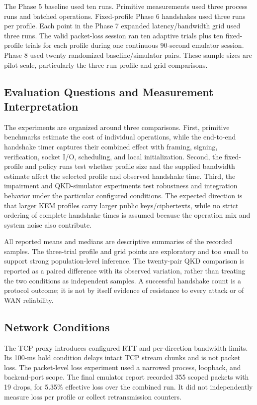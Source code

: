 \documentclass[journal]{IEEEtran}
\begin{document}
The Phase 5 baseline used ten runs. Primitive measurements used three process runs and batched operations. Fixed-profile Phase 6 handshakes used three runs per profile. Each point in the Phase 7 expanded latency/bandwidth grid used three runs. The valid packet-loss session ran ten adaptive trials plus ten fixed-profile trials for each profile during one continuous 90-second emulator session. Phase 8 used twenty randomized baseline/simulator pairs. These sample sizes are pilot-scale, particularly the three-run profile and grid comparisons.

\subsection{Evaluation Questions and Measurement Interpretation}
The experiments are organized around three comparisons. First, primitive benchmarks estimate the cost of individual operations, while the end-to-end handshake timer captures their combined effect with framing, signing, verification, socket I/O, scheduling, and local initialization. Second, the fixed-profile and policy runs test whether profile size and the supplied bandwidth estimate affect the selected profile and observed handshake time. Third, the impairment and QKD-simulator experiments test robustness and integration behavior under the particular configured conditions. The expected direction is that larger KEM profiles carry larger public keys/ciphertexts, while no strict ordering of complete handshake times is assumed because the operation mix and system noise also contribute.

All reported means and medians are descriptive summaries of the recorded samples. The three-trial profile and grid points are exploratory and too small to support strong population-level inference. The twenty-pair QKD comparison is reported as a paired difference with its observed variation, rather than treating the two conditions as independent samples. A successful handshake count is a protocol outcome; it is not by itself evidence of resistance to every attack or of WAN reliability.

\subsection{Network Conditions}
The TCP proxy introduces configured RTT and per-direction bandwidth limits. Its 100-ms hold condition delays intact TCP stream chunks and is not packet loss. The packet-level loss experiment used a narrowed process, loopback, and backend-port scope. The final emulator report recorded 355 scoped packets with 19 drops, for 5.35\% effective loss over the combined run. It did not independently measure loss per profile or collect retransmission counters.
\end{document}

